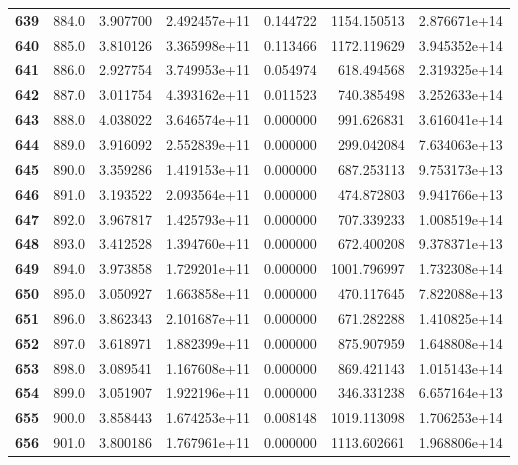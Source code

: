 \documentclass{report}[12pt]
\begin{document}
\begin{center}
\begin{tabular}{lrrrrrr}
\textbf{639 } &          884.0 &   3.907700 &  2.492457e+11 &    0.144722 &  1154.150513 &  2.876671e+14 \\
\textbf{640 } &          885.0 &   3.810126 &  3.365998e+11 &    0.113466 &  1172.119629 &  3.945352e+14 \\
\textbf{641 } &          886.0 &   2.927754 &  3.749953e+11 &    0.054974 &   618.494568 &  2.319325e+14 \\
\textbf{642 } &          887.0 &   3.011754 &  4.393162e+11 &    0.011523 &   740.385498 &  3.252633e+14 \\
\textbf{643 } &          888.0 &   4.038022 &  3.646574e+11 &    0.000000 &   991.626831 &  3.616041e+14 \\
\textbf{644 } &          889.0 &   3.916092 &  2.552839e+11 &    0.000000 &   299.042084 &  7.634063e+13 \\
\textbf{645 } &          890.0 &   3.359286 &  1.419153e+11 &    0.000000 &   687.253113 &  9.753173e+13 \\
\textbf{646 } &          891.0 &   3.193522 &  2.093564e+11 &    0.000000 &   474.872803 &  9.941766e+13 \\
\textbf{647 } &          892.0 &   3.967817 &  1.425793e+11 &    0.000000 &   707.339233 &  1.008519e+14 \\
\textbf{648 } &          893.0 &   3.412528 &  1.394760e+11 &    0.000000 &   672.400208 &  9.378371e+13 \\
\textbf{649 } &          894.0 &   3.973858 &  1.729201e+11 &    0.000000 &  1001.796997 &  1.732308e+14 \\
\textbf{650 } &          895.0 &   3.050927 &  1.663858e+11 &    0.000000 &   470.117645 &  7.822088e+13 \\
\textbf{651 } &          896.0 &   3.862343 &  2.101687e+11 &    0.000000 &   671.282288 &  1.410825e+14 \\
\textbf{652 } &          897.0 &   3.618971 &  1.882399e+11 &    0.000000 &   875.907959 &  1.648808e+14 \\
\textbf{653 } &          898.0 &   3.089541 &  1.167608e+11 &    0.000000 &   869.421143 &  1.015143e+14 \\
\textbf{654 } &          899.0 &   3.051907 &  1.922196e+11 &    0.000000 &   346.331238 &  6.657164e+13 \\
\textbf{655 } &          900.0 &   3.858443 &  1.674253e+11 &    0.008148 &  1019.113098 &  1.706253e+14 \\
\textbf{656 } &          901.0 &   3.800186 &  1.767961e+11 &    0.000000 &  1113.602661 &  1.968806e+14 \\

\end{tabular}
\end{center}
\end{document}
